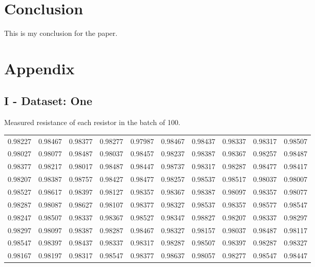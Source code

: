 \documentclass[10pt]{report}
\begin{document}
\newpage
\section*{Conclusion}

This is my conclusion for the paper.





\newpage
\section*{Appendix}

\subsection*{I - Dataset: One}

Measured resistance of each resistor in the batch of 100.


\begin{tabular}{rrrrrrrrrr}
	\hline
	 0.98227 & 0.98467 & 0.98377 & 0.98277 & 0.97987 & 0.98467 & 0.98437 & 0.98337 & 0.98317 & 0.98507 \\
	 0.98027 & 0.98077 & 0.98487 & 0.98037 & 0.98457 & 0.98237 & 0.98387 & 0.98367 & 0.98257 & 0.98487 \\
	 0.98377 & 0.98217 & 0.98017 & 0.98487 & 0.98447 & 0.98737 & 0.98317 & 0.98287 & 0.98477 & 0.98417 \\
	 0.98207 & 0.98387 & 0.98757 & 0.98427 & 0.98477 & 0.98257 & 0.98537 & 0.98517 & 0.98037 & 0.98007 \\
	 0.98527 & 0.98617 & 0.98397 & 0.98127 & 0.98357 & 0.98367 & 0.98387 & 0.98097 & 0.98357 & 0.98077 \\
	 0.98287 & 0.98087 & 0.98627 & 0.98107 & 0.98377 & 0.98327 & 0.98537 & 0.98357 & 0.98577 & 0.98547 \\
	 0.98247 & 0.98507 & 0.98337 & 0.98367 & 0.98527 & 0.98347 & 0.98827 & 0.98207 & 0.98337 & 0.98297 \\
	 0.98297 & 0.98097 & 0.98387 & 0.98287 & 0.98467 & 0.98327 & 0.98157 & 0.98037 & 0.98487 & 0.98117 \\
	 0.98547 & 0.98397 & 0.98437 & 0.98337 & 0.98317 & 0.98287 & 0.98507 & 0.98397 & 0.98287 & 0.98327 \\
	 0.98167 & 0.98197 & 0.98317 & 0.98547 & 0.98377 & 0.98637 & 0.98057 & 0.98277 & 0.98547 & 0.98447 \\
	 \hline
\end{tabular}
\end{document}
